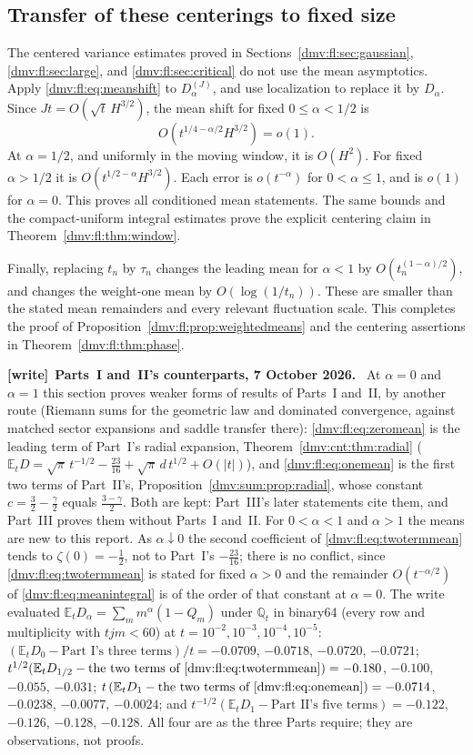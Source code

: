 \documentclass[11pt,letterpaper]{article}
\numberwithin{equation}{section}
\theoremstyle{definition}\newtheorem{definition}[theorem]{Definition}
\theoremstyle{remark}\newtheorem{remark}[theorem]{Remark}
\newcommand{\E}{\mathbb E}
\newenvironment{writenote}[1][]{\par\smallskip\begingroup\small
 \noindent\textbf{[write]}\if\relax\detokenize{#1}\relax\else~\textbf{#1.}\fi\ }%
 {\par\endgroup\smallskip}
\newcommand{\Q}{\mathbb Q}
\begin{document}
\subsection{Transfer of these centerings to fixed size}
The centered variance estimates proved in Sections~\ref{dmv:fl:sec:gaussian},
\ref{dmv:fl:sec:large}, and \ref{dmv:fl:sec:critical} do not use the mean asymptotics.
Apply \eqref{dmv:fl:eq:meanshift} to $D_\alpha^{(J)}$, and use localization
to replace it by $D_\alpha$. Since $Jt=O(\sqrt t\,H^{3/2})$,
the mean shift for fixed $0\le\alpha<1/2$ is
\[
 O(t^{1/4-\alpha/2}H^{3/2})=o(1).
\]
At $\alpha=1/2$, and uniformly in the moving window, it is $O(H^2)$.
For fixed $\alpha>1/2$ it is $O(t^{1/2-\alpha}H^{3/2})$.
Each error is $o(t^{-\alpha})$ for $0<\alpha\le1$, and is
$o(1)$ for $\alpha=0$. This proves all conditioned mean statements.
The same bounds and the compact-uniform integral estimates prove the
explicit centering claim in Theorem~\ref{dmv:fl:thm:window}.

Finally, replacing $t_n$ by $\tau_n$ changes the leading mean for
$\alpha<1$ by $O(t_n^{(1-\alpha)/2})$, and changes the weight-one mean
by $O(\log(1/t_n))$. These are smaller than the stated mean remainders
and every relevant fluctuation scale. This completes the proof of
Proposition~\ref{dmv:fl:prop:weightedmeans} and the centering assertions in
Theorem~\ref{dmv:fl:thm:phase}.
\begin{writenote}[Parts~I and~II's counterparts, 7 October 2026]
At $\alpha=0$ and $\alpha=1$ this section proves weaker forms of results
of Parts~I and~II, by another route (Riemann sums for the geometric law
and dominated convergence, against matched sector expansions and saddle
transfer there): \eqref{dmv:fl:eq:zeromean} is the leading term of
Part~I's radial expansion, Theorem~\ref{dmv:cnt:thm:radial}
($\E_tD=\sqrt\pi\,t^{-1/2}-\tfrac{23}{16}+\sqrt\pi\,d\,t^{1/2}+O(|t|)$),
and \eqref{dmv:fl:eq:onemean} is the first two terms of Part~II's,
Proposition~\ref{dmv:sum:prop:radial}, whose constant
$c=\tfrac32-\tfrac\gamma2$ equals $\tfrac{3-\gamma}2$. Both are kept:
Part~III's later statements cite them, and Part~III proves them without
Parts~I and~II. For $0<\alpha<1$ and $\alpha>1$ the means are new to this
report. As $\alpha\downarrow0$ the second coefficient of
\eqref{dmv:fl:eq:twotermmean} tends to $\zeta(0)=-\tfrac12$, not to
Part~I's $-\tfrac{23}{16}$; there is no conflict, since
\eqref{dmv:fl:eq:twotermmean} is stated for fixed $\alpha>0$ and the
remainder $O(t^{-\alpha/2})$ of \eqref{dmv:fl:eq:meanintegral} is of the
order of that constant at $\alpha=0$. The write evaluated
$\E_tD_\alpha=\sum_mm^\alpha(1-Q_m)$ under $\Q_t$ in binary64 (every row
and multiplicity with $tjm<60$) at $t=10^{-2},10^{-3},10^{-4},10^{-5}$:
$(\E_tD_0-\text{Part~I's three terms})/t=-0.0709$, $-0.0718$, $-0.0720$,
$-0.0721$; $t^{1/2}(\E_tD_{1/2}-\text{the two terms of
\eqref{dmv:fl:eq:twotermmean}})=-0.180$, $-0.100$, $-0.055$, $-0.031$;
$t\,(\E_tD_1-\text{the two terms of \eqref{dmv:fl:eq:onemean}})=-0.0714$,
$-0.0238$, $-0.0077$, $-0.0024$; and
$t^{-1/2}(\E_tD_1-\text{Part~II's five terms})=-0.122$, $-0.126$,
$-0.128$, $-0.128$. All four are as the three Parts require; they are
observations, not proofs.
\end{writenote}
\end{document}
